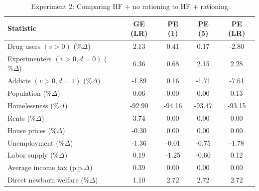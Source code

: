 \begin{table}[htbp]
\centering
\caption{Experiment 2: Comparing HF + no rationing to HF + rationing}
\label{tab:experiment_2}
\renewcommand{\arraystretch}{1.2}
\begin{tabular}{lcccc}
\toprule
Statistic & GE (LR) & PE (1) & PE (5) & PE (LR) \\
\midrule
Drug users $(v>0)$ ($\%\Delta$)                    &   2.13 &   0.41 &   0.17 &  -2.80 \\
Experimenters $(v>0, d=0)$ ($\%\Delta$)            &   6.36 &   0.68 &   2.15 &   2.28 \\
Addicts $(v>0, d=1)$ ($\%\Delta$)                  &  -1.89 &   0.16 &  -1.71 &  -7.61 \\
Population ($\%\Delta$)                       &   0.06 &   0.00 &   0.00 &   0.13 \\
Homelessness ($\%\Delta$)                          & -92.90 & -94.16 & -93.47 & -93.15 \\
Rents ($\%\Delta$)                                 &   3.74 &   0.00 &   0.00 &   0.00 \\
House prices ($\%\Delta$)                          &  -0.30 &   0.00 &   0.00 &   0.00 \\
Unemployment ($\%\Delta$)                          &  -1.36 &  -0.01 &  -0.75 &  -1.78 \\
Labor supply ($\%\Delta$)                          &   0.19 &  -1.25 &  -0.60 &   0.12 \\
Average income tax (p.p.$\Delta$)                  &   0.39 &   0.00 &  0.00 &   0.00 \\
Direct newborn welfare ($\%\Delta$)                &   1.10 &   2.72 &   2.72 &   2.72 \\
\bottomrule
\bottomrule
\end{tabular}
\end{table}
